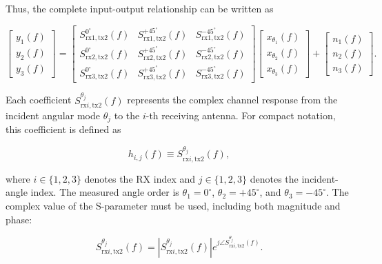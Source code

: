 \documentclass[10pt]{article}
\begin{document}
Thus, the complete input-output relationship can be written as

\begin{equation}
\begin{bmatrix}
y_1(f)\\
y_2(f)\\
y_3(f)
\end{bmatrix}
=
\begin{bmatrix}
S_{\mathrm{rx1},\mathrm{tx2}}^{0^\circ}(f) &
S_{\mathrm{rx1},\mathrm{tx2}}^{+45^\circ}(f) &
S_{\mathrm{rx1},\mathrm{tx2}}^{-45^\circ}(f)\\
S_{\mathrm{rx2},\mathrm{tx2}}^{0^\circ}(f) &
S_{\mathrm{rx2},\mathrm{tx2}}^{+45^\circ}(f) &
S_{\mathrm{rx2},\mathrm{tx2}}^{-45^\circ}(f)\\
S_{\mathrm{rx3},\mathrm{tx2}}^{0^\circ}(f) &
S_{\mathrm{rx3},\mathrm{tx2}}^{+45^\circ}(f) &
S_{\mathrm{rx3},\mathrm{tx2}}^{-45^\circ}(f)
\end{bmatrix}
\begin{bmatrix}
x_{\theta_1}(f)\\
x_{\theta_2}(f)\\
x_{\theta_3}(f)
\end{bmatrix}
+
\begin{bmatrix}
n_1(f)\\
n_2(f)\\
n_3(f)
\end{bmatrix}.
\label{eq:expanded_angular_channel}
\end{equation}

Each coefficient \(S_{\mathrm{rx}i,\mathrm{tx2}}^{\theta_j}(f)\) represents the complex channel response from the incident angular mode \(\theta_j\) to the \(i\)-th receiving antenna. 
For compact notation, this coefficient is defined as

\begin{equation}
h_{i,j}(f) \equiv S_{\mathrm{rx}i,\mathrm{tx2}}^{\theta_j}(f),
\label{eq:s21_channel}
\end{equation}

where \(i\in\{1,2,3\}\) denotes the RX index and \(j\in\{1,2,3\}\) denotes the incident-angle index. 
The measured angle order is \(\theta_1=0^\circ\), \(\theta_2=+45^\circ\), and \(\theta_3=-45^\circ\). 
The complex value of the S-parameter must be used, including both magnitude and phase:

\begin{equation}
S_{\mathrm{rx}i,\mathrm{tx2}}^{\theta_j}(f)
=
\left|S_{\mathrm{rx}i,\mathrm{tx2}}^{\theta_j}(f)\right|
e^{j\angle S_{\mathrm{rx}i,\mathrm{tx2}}^{\theta_j}(f)}.
\label{eq:complex_s21}
\end{equation}
\end{document}
